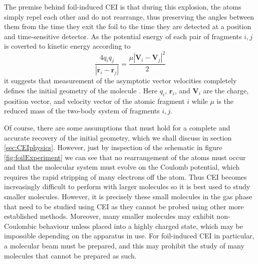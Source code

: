 The premise behind foil-induced CEI is that during this explosion, the atoms simply repel each other and do not rearrange, thus preserving the angles between them from the time they exit the foil to the time they are detected at a position and time-sensitive detector. As the potential energy of each pair of fragments $i,j$ is coverted to kinetic energy according to
\begin{equation}\label{eq:foilCEI}
\frac{4q_i q_j}{|\mathbf{r}_i - \mathbf{r}_j|} = \frac{\mu|\mathbf{V}_i - \mathbf{V}_j|^2}{2}
\end{equation}
it suggests that measurement of the asymptotic vector velocities completely defines the initial geometry of the molecule \citep{Vager89}. Here $q_i$, $\mathbf{r}_i$, and $\mathbf{V}_i$ are the charge, position vector, and velocity vector of the atomic fragment $i$ while $\mu$ is the reduced mass of the two-body system of fragments $i,j$.

Of course, there are some assumptions that must hold for a complete and accurate recovery of the initial geometry, which we shall discuss in section \ref{sec:CEIphysics}. However, just by inspection of the schematic in figure \ref{fig:foilExperiment} we can see that no rearrangement of the atoms must occur\footnotemark~ and that the molecular system must evolve on the Coulomb potential, which requires the rapid stripping of many electrons off the atom. Thus CEI becomes increasingly difficult to perform with larger molecules so it is best used to study smaller molecules. However, it is precisely these small molecules in the gas phase that need to be studied using CEI as they cannot be probed using other more established methods. Moreover, many smaller molecules may exhibit non-Coulombic behaviour unless placed into a highly charged state, which may be impossible depending on the apparatus in use. For foil-induced CEI in particular, a molecular beam must be prepared, and this may prohibit the study of many molecules that cannot be prepared as such.


